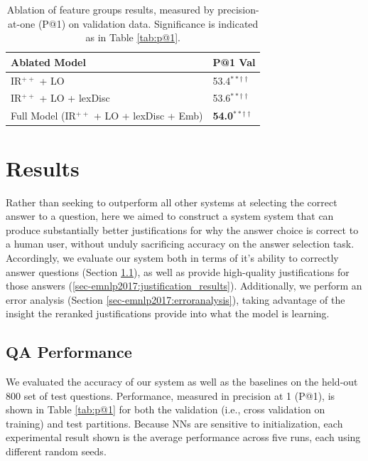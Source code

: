 \begin{table}[t!]
\begin{center}
\begin{footnotesize}
\begin{tabular}{ll}
\hline
 Ablated Model & P@1 Val \\ 
\hline
	IR$^{++}$ + LO 					&		53.4$^{**\dagger\dagger}$\\
	IR$^{++}$ + LO + lexDisc 	&		53.6$^{**\dagger\dagger}$ \\
    Full Model (IR$^{++}$ + LO + lexDisc + Emb)  &	{\bf 54.0}$^{**\dagger\dagger}$	\\
\end{tabular}
\end{footnotesize}
\caption{{\footnotesize Ablation of feature groups results, measured by precision-at-one (P@1) on validation data.  Significance is indicated as in Table \ref{tab:p@1}.}} 
\label{tab:ablation}
\end{center}
\end{table}

\section{Results}
\label{sec-emnlp2017:results}

Rather than seeking to outperform all other systems at selecting the correct answer to a question, here we aimed to construct a system system that can produce substantially better justifications for why the answer choice is correct to a human user, without unduly sacrificing accuracy on the answer selection task.  Accordingly, we evaluate our system both in terms of it's ability to correctly answer questions (Section \ref{sec-emnlp2017:accuracy}), as well as provide high-quality justifications for those answers (\ref{sec-emnlp2017:justification_results}).  Additionally, we perform an error analysis (Section \ref{sec-emnlp2017:erroranalysis}), taking advantage of the insight the reranked justifications provide into what the model is learning.

\subsection{QA Performance}
\label{sec-emnlp2017:accuracy}
We evaluated the accuracy of our system as well as the baselines on the held-out 800 set of test questions.  Performance, measured in precision at 1 (P@1)\cite{manning08}, is shown in Table \ref{tab:p@1} for both the validation (i.e., cross validation on training) and test partitions.  Because NNs are sensitive to initialization, each experimental result shown is the average performance across five runs, each using different random seeds.   

